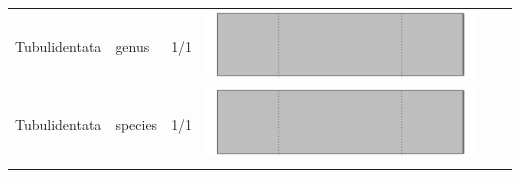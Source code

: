 \begin{longtable}{lL{1.8cm}C{2cm}lcc}
  Tubulidentata & genus & 1/1 & \includegraphics[width=0.20\linewidth, height=0.05\linewidth]{Supplementaries/Figures/Chapter2/Results_1c/Table_figures/bar83.pdf} &   &   \\ 
  Tubulidentata & species & 1/1 & \includegraphics[width=0.20\linewidth, height=0.05\linewidth]{Supplementaries/Figures/Chapter2/Results_1c/Table_figures/bar84.pdf} &   &   \\ 
   \hline
\hline
\label{Table_results}
\end{longtable}
